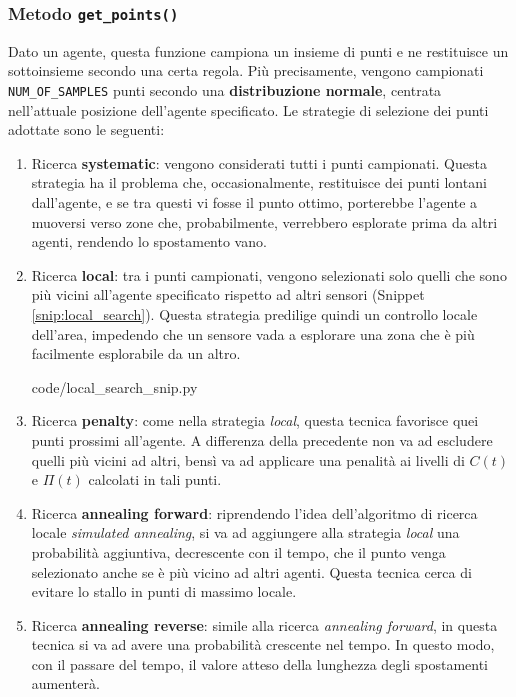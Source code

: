 \subsubsection{Metodo \texttt{get\_points()}}
Dato un agente, questa funzione campiona un insieme di punti e ne restituisce un sottoinsieme secondo una certa regola.
Più precisamente, vengono campionati \texttt{NUM\_OF\_SAMPLES} punti secondo una \textbf{distribuzione normale}, centrata nell'attuale posizione dell'agente specificato.
Le strategie di selezione dei punti adottate sono le seguenti:
\begin{enumerate}

\item
Ricerca \textbf{systematic}: vengono considerati tutti i punti campionati. 
Questa strategia ha il problema che, occasionalmente, restituisce dei punti lontani dall'agente, e se tra questi vi fosse il punto ottimo, porterebbe l'agente a muoversi verso zone che, probabilmente, verrebbero esplorate prima da altri agenti, rendendo lo spostamento vano.

\item
Ricerca \textbf{local}: tra i punti campionati, vengono selezionati solo quelli che sono più vicini all'agente specificato rispetto ad altri sensori (Snippet \ref{snip:local_search}). Questa strategia predilige quindi un controllo locale dell'area, impedendo che un sensore vada a esplorare una zona che è più facilmente esplorabile da un altro.


{code/local_search_snip.py}

\item
Ricerca \textbf{penalty}: come nella strategia \textit{local}, questa tecnica favorisce quei punti prossimi all'agente. A differenza della precedente non va ad escludere quelli più vicini ad altri, bensì va ad applicare una penalità ai livelli di $C(t)$ e $\Pi(t)$ calcolati in tali punti.

\pagebreak
\item
Ricerca \textbf{annealing forward}: riprendendo l'idea dell'algoritmo di ricerca locale \textit{simulated annealing}, si va ad aggiungere alla strategia \textit{local} una probabilità aggiuntiva, decrescente con il tempo, che il punto venga selezionato anche se è più vicino ad altri agenti. %
Questa tecnica cerca di evitare lo stallo in punti di massimo locale.

\item
Ricerca \textbf{annealing reverse}: simile alla ricerca \textit{annealing forward}, in questa tecnica si va ad avere una probabilità crescente nel tempo. %
In questo modo, con il passare del tempo, il valore atteso della lunghezza degli spostamenti aumenterà.
\end{enumerate}

